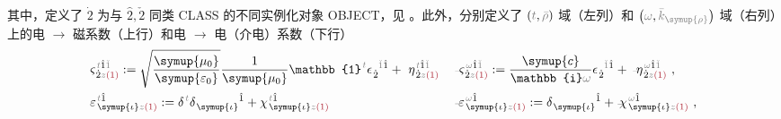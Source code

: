 其中，定义了 $\dot{2}$ 为与 $\hat{2},\check{2}$ 同类 CLASS 的不同实例化对象 OBJECT，见 。此外，分别定义了 $\left( \mathcolor{gray}{t}, \mathcolor{gray}{\bar{\rho}} \right)$ 域（左列）和 $\left( \mathcolor{gray}{\omega}, \mathcolor{gray}{\bar{k}_{\symup{\rho}}} \right)$ 域（右列）上的\textcolor{NavyBlue}{电 $\to$ 磁}系数（上行）和\textcolor{NavyBlue}{电 $\to$ 电}（介电）系数（下行）
\begin{subequations}
	\belowdisplayskip=8pt
\begin{align}
	&\varsigma^{\;\! \mathcolor{gray}{t} \hat{1} \mathcolor{gray}{\check{1}}}_{\;\! \dot{2} \mathcolor{gray}{z} \textcolor{Maroon}{(1)}} := \sqrt{\frac{\symup{\mu_0}}{\symup{\varepsilon_0}}} \frac{1}{\symup{\mu_0}} \mathbb{1}^{\;\! \mathcolor{gray}{t}} \epsilon^{\;\! \hphantom{\dot{2}} \mathcolor{gray}{\check{1}} \hat{1}}_{\;\! \dot{2}} + ~\eta^{\;\! \mathcolor{gray}{t} \hat{1} \mathcolor{gray}{\check{1}}}_{\;\! \dot{2} \mathcolor{gray}{z} \textcolor{Maroon}{(1)}}
	&&\xint{\begin{smallmatrix} ~ \\ {}^{}_{\mathcolor{gray}{-}} \\ ~ \end{smallmatrix}}{13}{\varsigma}^{\;\! \mathcolor{gray}{\omega} \hat{1} \mathcolor{gray}{\check{1}}}_{\;\! \dot{2} \mathcolor{gray}{z} \textcolor{Maroon}{(1)}} := \frac{\symup{c}}{\mathbb{i} \mathcolor{gray}{\omega}} \epsilon^{\;\! \hphantom{\dot{2}} \mathcolor{gray}{\check{1}} \hat{1}}_{\;\! \dot{2}} + \xint{\begin{smallmatrix} ~ \\ {}^{}_{\mathcolor{gray}{-}} \\ ~ \end{smallmatrix}}{17}{\eta}^{\;\! \mathcolor{gray}{\omega} \hat{1} \mathcolor{gray}{\check{1}}}_{\;\! \dot{2} \mathcolor{gray}{z} \textcolor{Maroon}{(1)}}~, \label{eq:varsigma_rho} \\
	&\varepsilon^{\;\! \mathcolor{gray}{t} \hat{1}}_{\;\! \symup{\iota} \mathcolor{gray}{z} \textcolor{Maroon}{(1)}} := \delta^{\;\! \mathcolor{gray}{t}} \delta^{\;\! \hphantom{\symup{\iota}} \hat{1}}_{\;\! \symup{\iota} \hphantom{z}} + \chi^{\;\! \mathcolor{gray}{t} \hat{1}}_{\;\! \symup{\iota} \mathcolor{gray}{z} \textcolor{Maroon}{(1)}}
	&&\xint{\begin{smallmatrix} ~ \\ {}^{}_{\mathcolor{gray}{-}} \\ ~ \end{smallmatrix}}{16}{\varepsilon}^{\;\! \mathcolor{gray}{\omega} \hat{1}}_{\;\! \symup{\iota} \mathcolor{gray}{z} \textcolor{Maroon}{(1)}} := \delta^{\;\! \hphantom{\symup{\iota}} \hat{1}}_{\;\! \symup{\iota} \hphantom{z}} + \xint{{}^{}_{\mathcolor{gray}{-}}}{23}{\chi}^{\;\! \mathcolor{gray}{\omega} \hat{1}}_{\;\! \symup{\iota} \mathcolor{gray}{z} \textcolor{Maroon}{(1)}}~, \label{eq:varepsilon_rho}
\end{align}
\end{subequations}
